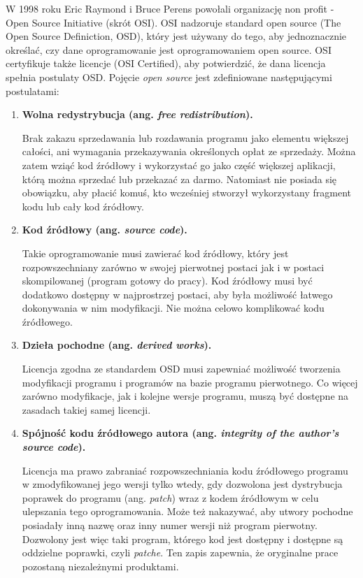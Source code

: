 \documentclass{article}
\begin{document}
W 1998 roku Eric Raymond i Bruce Perens powołali organizację non profit - Open Source Initiative (skrót OSI)\cite{Kotula}. OSI nadzoruje standard open source (The Open Source Definiction, OSD), który jest używany do tego, aby jednoznacznie określać, czy dane oprogramowanie jest oprogramowaniem open source. OSI certyfikuje także licencje (OSI Certified), aby potwierdzić, że dana
licencja spełnia postulaty OSD\cite{opensource.org}. Pojęcie \emph{open source} jest zdefiniowane następującymi postulatami\cite{Kotula}:

\begin{enumerate}
    \item \textbf{Wolna redystrybucja (ang. \emph{free redistribution}).}
    
    \hspace{4mm} Brak zakazu sprzedawania lub rozdawania programu jako elementu większej całości, ani wymagania przekazywania określonych opłat ze sprzedaży. Można zatem wziąć kod źródłowy i wykorzystać go jako część większej aplikacji, którą można sprzedać lub przekazać za darmo. Natomiast nie posiada się obowiązku, aby płacić komuś, kto wcześniej stworzył wykorzystany fragment kodu lub cały kod źródłowy.
    
    \item \textbf{Kod źródłowy (ang. \emph{source code}).}
    
    \hspace{4mm} Takie oprogramowanie musi zawierać kod źródłowy, który jest rozpowszechniany zarówno w swojej pierwotnej postaci jak i w postaci skompilowanej (program gotowy do pracy). Kod źródłowy musi być dodatkowo dostępny w najprostrzej postaci, aby była możliwość łatwego dokonywania w nim modyfikacji. Nie można celowo komplikować kodu źródłowego.
    
    \item \textbf{Dzieła pochodne (ang. \emph{derived works}).}
    
    \hspace{4mm} Licencja zgodna ze standardem OSD musi zapewniać możliwość tworzenia modyfikacji programu i programów na bazie programu pierwotnego. Co więcej zarówno modyfikacje, jak i kolejne wersje programu, muszą być dostępne na zasadach takiej samej licencji. \newpage
    
    \item \textbf{Spójność kodu źródłowego autora (ang. \emph{integrity of the author’s source code}).}
    
    \hspace{4mm} Licencja ma prawo zabraniać rozpowszechniania kodu źródłowego programu w zmodyfikowanej jego wersji tylko wtedy, gdy dozwolona jest dystrybucja poprawek do programu (ang. \emph{patch}) wraz z kodem źródłowym w celu ulepszania tego oprogramowania. Może też nakazywać, aby utwory pochodne posiadały inną nazwę oraz inny numer wersji niż program pierwotny. Dozwolony jest więc taki program, którego kod jest dostępny i dostępne są oddzielne poprawki, czyli \emph{patche}. Ten zapis zapewnia, że oryginalne prace pozostaną niezależnymi produktami.
    

\end{enumerate}
\end{document}
